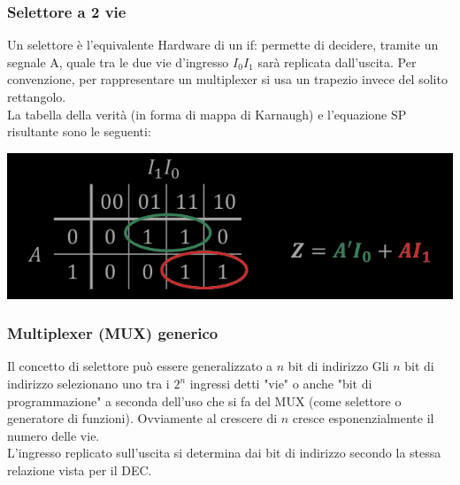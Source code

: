 \documentclass{article}
\begin{document}
\subsubsection{Selettore a 2 vie}
Un selettore è l'equivalente Hardware di un {\selectfont if}: permette di decidere, tramite un segnale A, quale tra le due vie d'ingresso $I_0 I_1$ sarà replicata dall'uscita. Per convenzione, per rappresentare un multiplexer si usa un trapezio invece del solito rettangolo.\\
La tabella della verità (in forma di mappa di Karnaugh) e l’equazione SP risultante sono le seguenti:
\begin{center}
    \includegraphics[scale=0.6]{TDVMulti.png}
\end{center}
\subsubsection{Multiplexer (MUX) generico}
Il concetto di selettore può essere generalizzato a $n$ bit di indirizzo
Gli $n$ bit di indirizzo selezionano uno tra i $2^n$ ingressi detti "vie" o anche "bit di programmazione" a seconda dell’uso che si fa del MUX (come selettore o generatore di funzioni). Ovviamente al crescere di $n$ cresce esponenzialmente il numero delle vie.\\
L’ingresso replicato sull’uscita si determina dai bit di indirizzo secondo la stessa relazione vista per il DEC.
\end{document}
